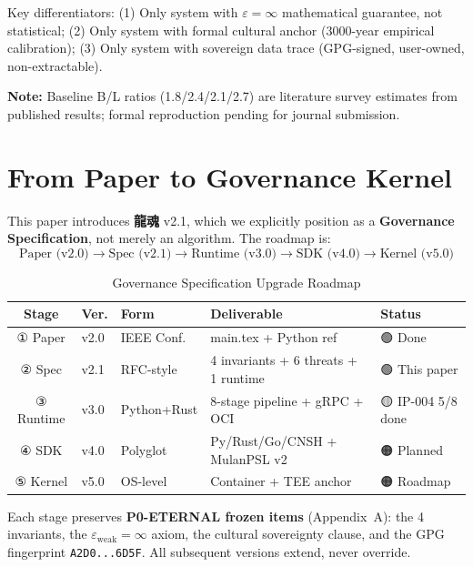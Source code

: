 \documentclass[conference]{IEEEtran}
\newcommand{\LH}{\textcolor{dragonRed}{\textbf{龍魂}}}
\begin{document}
Key differentiators:
(1) Only system with $\varepsilon = \infty$
mathematical guarantee, not statistical;
(2) Only system with formal cultural anchor
(3000-year empirical calibration);
(3) Only system with sovereign data trace
(GPG-signed, user-owned, non-extractable).

\noindent\textbf{Note:} Baseline B/L ratios (1.8/2.4/2.1/2.7) are
literature survey estimates from published results;
formal reproduction pending for journal submission.

\section{From Paper to Governance Kernel}
\label{sec:governance}

This paper introduces \LH{} v2.1, which we explicitly
position as a \textbf{Governance Specification}, not
merely an algorithm. The roadmap is:
\[
\text{Paper (v2.0)} \to \text{Spec (v2.1)} \to
\text{Runtime (v3.0)} \to \text{SDK (v4.0)} \to
\text{Kernel (v5.0)}
\]

\begin{table}[h]
\centering
\caption{Governance Specification Upgrade Roadmap}
\label{tab:roadmap}
\begin{tabular}{cllp{2.5cm}l}
\toprule
\textbf{Stage} & \textbf{Ver.} & \textbf{Form} & \textbf{Deliverable} & \textbf{Status} \\
\midrule
① Paper    & v2.0 & IEEE Conf.   & main.tex + Python ref & 🟢 Done \\
② Spec     & v2.1 & RFC-style    & 4 invariants + 6 threats + 1 runtime & 🟢 This paper \\
③ Runtime  & v3.0 & Python+Rust  & 8-stage pipeline + gRPC + OCI & 🟡 IP-004 5/8 done \\
④ SDK      & v4.0 & Polyglot     & Py/Rust/Go/CNSH + MulanPSL v2 & 🟠 Planned \\
⑤ Kernel   & v5.0 & OS-level     & Container + TEE anchor & 🟠 Roadmap \\
\bottomrule
\end{tabular}
\end{table}

Each stage preserves \textbf{P0-ETERNAL frozen items}
(Appendix~A): the 4 invariants, the $\varepsilon_{\text{weak}}
= \infty$ axiom, the cultural sovereignty clause, and the
GPG fingerprint \texttt{A2D0...6D5F}.
All subsequent versions extend, never override.
\end{document}
